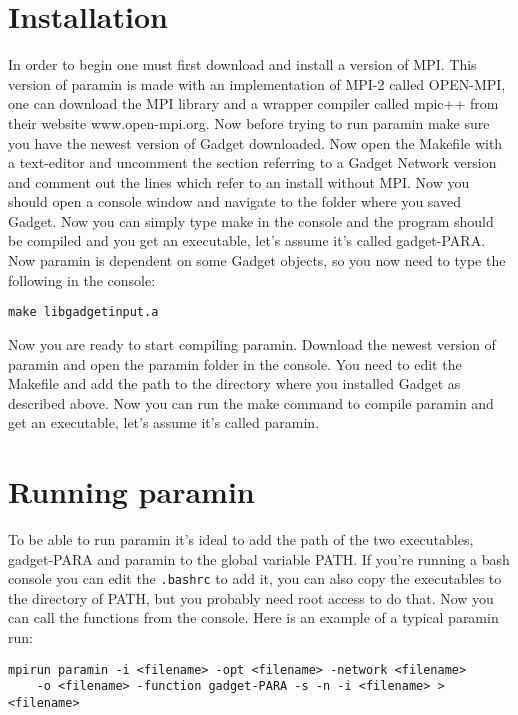 \documentclass[10pt,twoside]{book}
\begin{document}
\section{Installation}\label{sec:paramininstall}
In order to begin one must first download and install a version of MPI.  This version of paramin is made with an implementation of MPI-2 called OPEN-MPI, one can download the MPI library and a wrapper compiler called mpic++ from their website www.open-mpi.org.  Now before trying to run paramin make sure you have the newest version of Gadget downloaded.  Now open the Makefile with a text-editor and uncomment the section referring to a Gadget Network version and comment out the lines which refer to an install without MPI.  Now you should open a console window and navigate to the folder where you saved Gadget.  Now you can simply type make in the console and the program should be compiled and you get an executable, let's assume it's called gadget-PARA.  Now paramin is dependent on some Gadget objects, so you now need to type the following in the console:

{\small\begin{verbatim}
make libgadgetinput.a
\end{verbatim}}

Now you are ready to start compiling paramin.  Download the newest version of paramin and open the paramin folder in the console.  You need to edit the Makefile and add the path to the directory where you installed Gadget as described above.  Now you can run the make command to compile paramin and get an executable, let's assume it's called paramin.

\section{Running paramin}\label{sec:runparamin}
To be able to run paramin it's ideal to add the path of the two executables, gadget-PARA and paramin to the global variable PATH.  If you're running a bash console you can edit the \texttt{.bashrc} to add it, you can also copy the executables to the directory of PATH, but you probably need root access to do that.  Now you can call the functions from the console.  Here is an example of a typical paramin run:

{\small\begin{verbatim}
mpirun paramin -i <filename> -opt <filename> -network <filename> 
    -o <filename> -function gadget-PARA -s -n -i <filename> > <filename>
\end{verbatim}}
\end{document}

